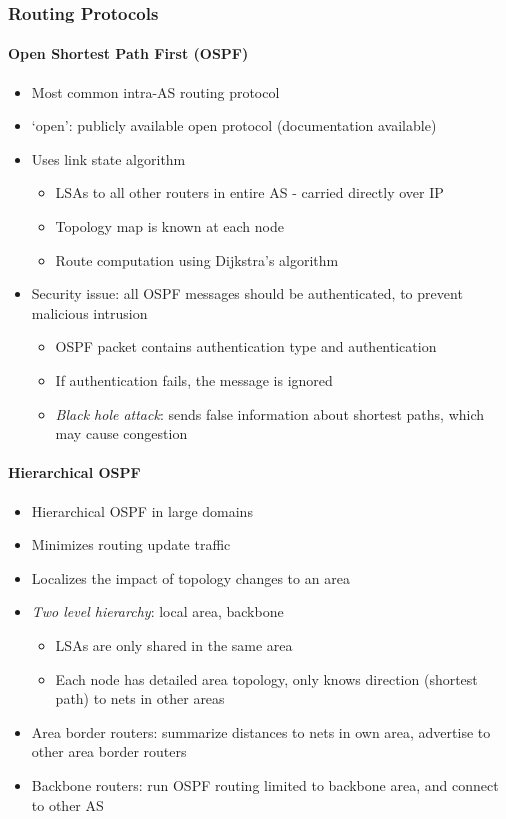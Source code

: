 \subsubsection{Routing Protocols}
\paragraph{Open Shortest Path First (OSPF)}
\begin{itemize}
	\item Most common intra-AS routing protocol
	\item `open': publicly available open protocol (documentation available)
	\item Uses link state algorithm
	\begin{itemize}
		\item LSAs to all other routers in entire AS - carried directly over IP
		\item Topology map is known at each node
		\item Route computation using Dijkstra's algorithm
	\end{itemize}
	\item Security issue: all OSPF messages should be authenticated, to prevent malicious intrusion
	\begin{itemize}
		\item OSPF packet contains authentication type and authentication
		\item If authentication fails, the message is ignored
		\item \textit{Black hole attack}: sends false information about shortest paths, which may cause congestion
	\end{itemize}
\end{itemize}

\paragraph{Hierarchical OSPF}
\begin{itemize}
	\item Hierarchical OSPF in large domains
	\item Minimizes routing update traffic
	\item Localizes the impact of topology changes to an area
	\item \textit{Two level hierarchy}: local area, backbone
	\begin{itemize}
		\item LSAs are only shared in the same area
		\item Each node has detailed area topology, only knows direction (shortest path) to nets in other areas
	\end{itemize}
	\item Area border routers: summarize distances to nets in own area, advertise to other area border routers
	\item Backbone routers: run OSPF routing limited to backbone area, and connect to other AS
\end{itemize}

